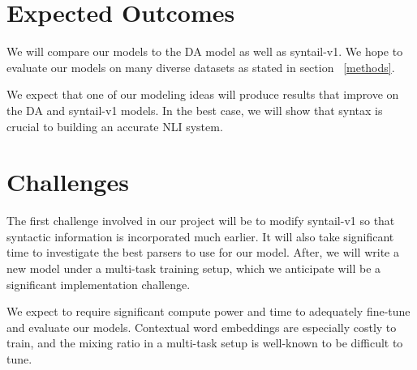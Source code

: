 \documentclass[11pt,a4paper]{article}
\begin{document}
\section{Expected Outcomes}

We will compare our models to the DA model as well as syntail-v1. We hope to
evaluate our models on many diverse datasets as stated in section
~\ref{methods}.

We expect that one of our modeling ideas will produce results that improve on
the DA and syntail-v1 models. In the best case, we will show that syntax is
crucial to building an accurate NLI system.

\section{Challenges}

The first challenge involved in our project will be to modify syntail-v1
so that syntactic information is incorporated much earlier. It will also take
significant time to investigate the best parsers to use for our model.
After, we will write a new model under a multi-task training setup, which we
anticipate will be a significant implementation challenge.

We expect to require significant compute power and time to adequately fine-tune
and evaluate our models. Contextual word embeddings are especially costly to
train, and the mixing ratio in a multi-task setup is well-known to be
difficult to tune.



\end{document}
